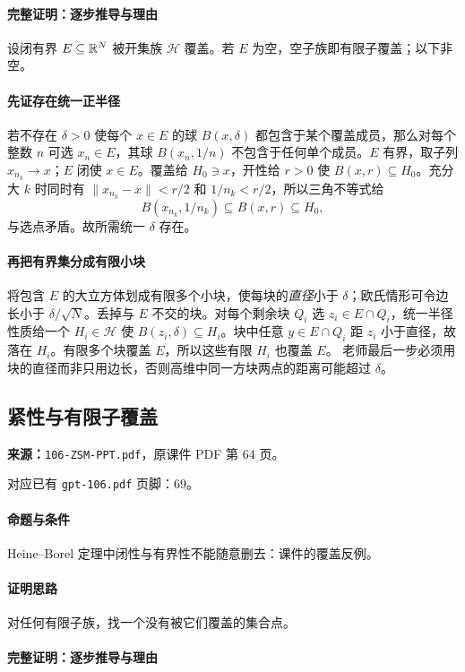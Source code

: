\paragraph{完整证明：逐步推导与理由}

设闭有界 $E\subseteq\mathbb{R}^N$ 被开集族 $\mathcal H$ 覆盖。若 $E$ 为空，空子族即有限子覆盖；以下非空。
\paragraph{先证存在统一正半径}
若不存在 $\delta>0$ 使每个 $x\in E$ 的球 $B(x,\delta)$ 都包含于某个覆盖成员，那么对每个整数 $n$ 可选 $x_n\in E$，其球 $B(x_n,1/n)$ 不包含于任何单个成员。$E$ 有界，取子列 $x_{n_k}\to x$；$E$ 闭使 $x\in E$。覆盖给 $H_0\ni x$，开性给 $r>0$ 使 $B(x,r)\subseteq H_0$。充分大 $k$ 时同时有 $\|x_{n_k}-x\|<r/2$ 和 $1/n_k<r/2$，所以三角不等式给
\[B(x_{n_k},1/n_k)\subseteq B(x,r)\subseteq H_0,\]
与选点矛盾。故所需统一 $\delta$ 存在。
\paragraph{再把有界集分成有限小块}
将包含 $E$ 的大立方体划成有限多个小块，使每块的\emph{直径}小于 $\delta$；欧氏情形可令边长小于 $\delta/\sqrt N$。丢掉与 $E$ 不交的块。对每个剩余块 $Q_i$ 选 $z_i\in E\cap Q_i$，统一半径性质给一个 $H_i\in\mathcal H$ 使 $B(z_i,\delta)\subseteq H_i$。块中任意 $y\in E\cap Q_i$ 距 $z_i$ 小于直径，故落在 $H_i$。有限多个块覆盖 $E$，所以这些有限 $H_i$ 也覆盖 $E$。
老师最后一步必须用块的直径而非只用边长，否则高维中同一方块两点的距离可能超过 $\delta$。

\clearpage\subsection{紧性与有限子覆盖}
\textbf{来源：}\texttt{106-ZSM-PPT.pdf}，原课件 PDF 第 64 页。\par
对应已有 \texttt{gpt-106.pdf} 页脚：69。\par
\paragraph{命题与条件}Heine--Borel 定理中闭性与有界性不能随意删去：课件的覆盖反例。
\paragraph{证明思路}对任何有限子族，找一个没有被它们覆盖的集合点。
\paragraph{完整证明：逐步推导与理由}

